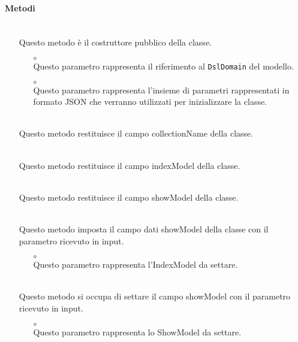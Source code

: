 \paragraph*{Metodi}
\begin{itemize}
\item[]  \\ Questo metodo è il costruttore pubblico della classe.
\begin{itemize}\addtolength{\itemsep}{-0.5\baselineskip}
\item[$\circ$]  \\ Questo parametro rappresenta il riferimento al \texttt{DslDomain} del modello.
\item[$\circ$]  \\ Questo parametro rappresenta l'insieme di parametri rappresentati in formato JSON che verranno utilizzati per inizializzare la classe.
\end{itemize}
\item[]  \\ Questo metodo restituisce il campo collectionName della classe.
\item[]  \\ Questo metodo restituisce il campo indexModel della classe.
\item[]  \\ Questo metodo restituisce il campo showModel della classe.
\item[]  \\ Questo metodo imposta il campo dati showModel della classe con il parametro ricevuto in input.
\begin{itemize}\addtolength{\itemsep}{-0.5\baselineskip}
\item[$\circ$]  \\ Questo parametro rappresenta l'IndexModel da settare.
\end{itemize}
\item[]  \\ Questo metodo si occupa di settare il campo showModel con il parametro ricevuto in input.
\begin{itemize}\addtolength{\itemsep}{-0.5\baselineskip}
\item[$\circ$]  \\ Questo parametro rappresenta lo ShowModel da settare.

\end{itemize}
\end{itemize}
